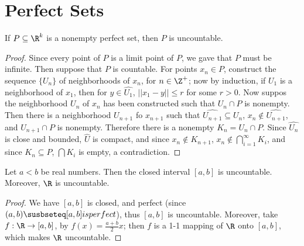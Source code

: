 \section{Perfect Sets}

\begin{theorem}\label{2.4.1}
  If $P \subseteq \R^k$ is a nonempty perfect set, then  $P$ is uncountable.
\end{theorem}
\begin{proof}
  Since every point of $P$ is a limit point of  $P$, we gave that  $P$ must be infinite.
  Then suppose that  $P$ is countable. For points  $x_n \in P$, construct the sequence
  $\{U_n\}$ of neighborhoods of  $x_n$, for  $n \in \Z^+$; now by induction, if  $U_1$ is
  a neighborhood of $x_1$, then for $y \in \hat{U_1}$, $||x_1-y|| \leq r$ for some $r>0$.
  Now suppos the neighborhood $U_n$ of  $x_n$ has been constructed such that  $U_n \cap P$
  is nonempty. Then there is a neighborhood  $U_{n+1}$ fo  $x_{n+1}$ such that
  $\hat{U_{n+1}} \subseteq U_n$,  $x_n \notin \hat{U_{n+1}}$, and  $U_{n+1} \cap P$ is nonempty.
  Therefore there is a  nonempty $K_n=U_n \cap P$. Since  $\hat{U_n}$ is close and
  bounded, $\hat{U}$ is compact, and since  $x_n \notin K_{n+1}$,  $x_n \notin \bigcap_{i=1}^{\infty}{K_i}$,
  and since  $K_n \subseteq P$,  $\bigcap{K_i}$ is empty, a contradiction.
\end{proof}

\begin{corollary}
  Let $a<b$ be real numbers. Then the closed interval  $[a,b]$ is uncountable.
  Moreover,  $\R$ is uncountable.
\end{corollary}
\begin{proof}
  We have $[a,b]$ is closed, and perfect (since $(a,b) \susbseteq [a,b] is perfect$),
  thus $[a,b]$ is uncountable. Moreover, take  $f:\R \rightarrow [a,b]$, by
  $f(x)=\frac{a+b}{2}x$; then $f$ is a 1-1 mapping of  $\R$ onto  $[a,b]$, which makes
  $\R$ uncountable.
\end{proof}

